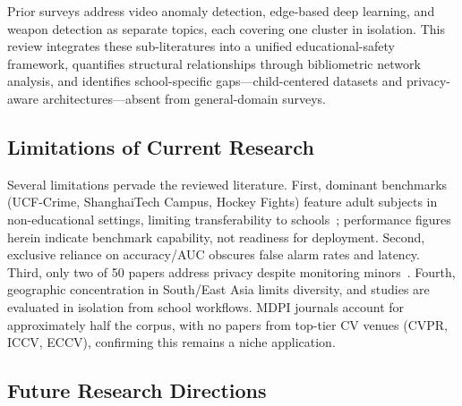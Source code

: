 \documentclass[conference]{IEEEtran}
\begin{document}
Prior surveys address video anomaly detection, edge-based deep learning, and weapon detection as separate topics, each covering one cluster in isolation. This review integrates these sub-literatures into a unified educational-safety framework, quantifies structural relationships through bibliometric network analysis, and identifies school-specific gaps---child-centered datasets and privacy-aware architectures---absent from general-domain surveys.

\subsection{Limitations of Current Research}

Several limitations pervade the reviewed literature. First, dominant benchmarks (UCF-Crime, ShanghaiTech Campus, Hockey Fights) feature adult subjects in non-educational settings, limiting transferability to schools~\cite{b15}; performance figures herein indicate benchmark capability, not readiness for deployment. Second, exclusive reliance on accuracy/AUC obscures false alarm rates and latency. Third, only two of 50 papers address privacy despite monitoring minors~\cite{b11}. Fourth, geographic concentration in South/East Asia limits diversity, and studies are evaluated in isolation from school workflows. MDPI journals account for approximately half the corpus, with no papers from top-tier CV venues (CVPR, ICCV, ECCV), confirming this remains a niche application.

\subsection{Future Research Directions}
\end{document}
